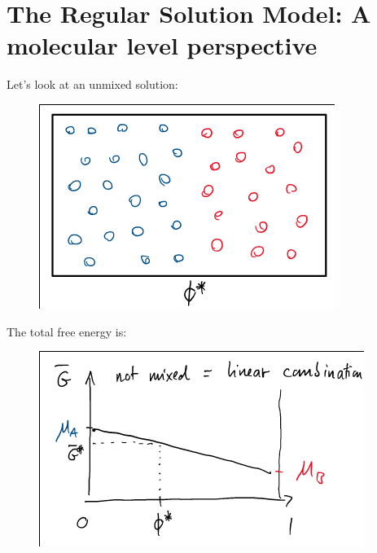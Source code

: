 \documentclass[a4paper, 11pt, normalem]{report}
\begin{document}
\section{The Regular Solution Model: A molecular level perspective}
\begin{multicols}{2}
    Let's look at an unmixed solution: 
    \begin{figure}[H]
        \centering
        \includegraphics[scale=0.5]{unmix.png}
    \end{figure}
    \columnbreak
    The total free energy is:
    \begin{figure}[H]
        \centering
        \includegraphics[scale=0.5]{unmixfree.png}
    \end{figure}
\end{multicols}
\end{document}
